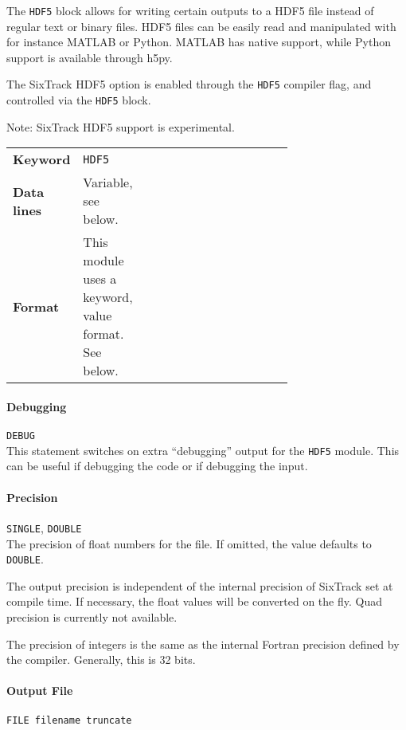 The \texttt{HDF5} block allows for writing certain outputs to a HDF5 file instead of regular text or binary files.
HDF5 files can be easily read and manipulated with for instance MATLAB or Python.
MATLAB has native support, while Python support is available through h5py.

The SixTrack HDF5 option is enabled through the \texttt{HDF5} compiler flag, and controlled via the \texttt{HDF5} block.

\bigskip
\noindent Note: SixTrack HDF5 support is experimental.

\bigskip
\begin{tabular}{@{}llp{0.7\linewidth}}
    \textbf{Keyword}    & \texttt{HDF5} \\
    \textbf{Data lines} & Variable, see below. \\
    \textbf{Format}     & This module uses a keyword, value format. See below.
\end{tabular}

\bigskip

\paragraph{Debugging} \texttt{DEBUG}\\

This statement switches on extra ``debugging'' output for the \texttt{HDF5} module.
This can be useful if debugging the code or if debugging the input.

\paragraph{Precision} \texttt{SINGLE}, \texttt{DOUBLE}\\

The precision of float numbers for the file. If omitted, the value defaults to \texttt{DOUBLE}.

The output precision is independent of the internal precision of SixTrack set at compile time.
If necessary, the float values will be converted on the fly.
Quad precision is currently not available.

The precision of integers is the same as the internal Fortran precision defined by the compiler.
Generally, this is 32 bits.

\paragraph{Output File} \texttt{FILE filename truncate}\\

